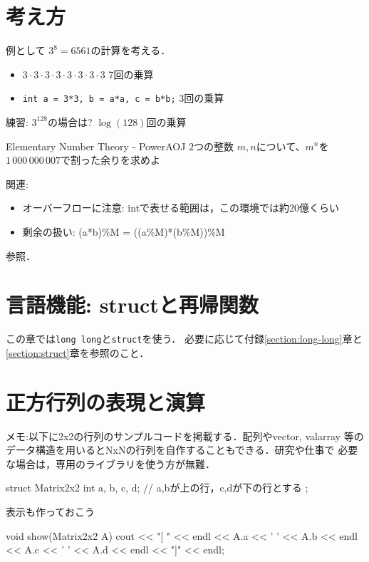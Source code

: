 \section{考え方}

例として $3^8 = 6561$の計算を考える．
\begin{itemize}
\setlength{\itemsep}{0pt}
\item $3\cdot{}3\cdot{}3\cdot{}3\cdot{}3\cdot{}3\cdot{}3\cdot{}3$ \dingright{} 7回の乗算
\item \texttt{int a = 3*3, b = a*a, c = b*b;} \dingright{} 3回の乗算
\end{itemize}

練習: $3^{128}$の場合は? \dingright{} $\log(128)$回の乗算


\begin{psbox}{Elementary Number Theory - Power}{AOJ}
$2$つの整数 $m, n$について、$m^n$を$1\,000\,000\,007$で割った余りを求めよ

\end{psbox}

関連:
\begin{itemize}
\setlength{\itemsep}{0pt}
\item オーバーフローに注意: intで表せる範囲は，この環境では約20億くらい
\item 剰余の扱い: (a*b)\%M = ((a\%M)*(b\%M))\%M
\end{itemize}
\pcaojbook[pp.~445--]参照．

\section{言語機能: structと再帰関数}
この章では\texttt{long long}と\texttt{struct}を使う．
必要に応じて付録\ref{section:long-long}章と\ref{section:struct}章を参照のこと．

\section{正方行列の表現と演算}
メモ:以下に2x2の行列のサンプルコードを掲載する．配列やvector, valarray
等のデータ構造を用いるとNxNの行列を自作することもできる．研究や仕事で
必要な場合は，専用のライブラリを使う方が無難．


\begin{cbox}
struct Matrix2x2 {
  int a, b, c, d; // a,bが上の行，c,dが下の行とする
};
\end{cbox}

表示も作っておこう

\begin{cbox}
void show(Matrix2x2 A) { 
    cout << "[ " << endl
         << A.a << ' ' << A.b << endl
         << A.c << ' ' << A.d << endl
         << "]" << endl;
}
\end{cbox}

